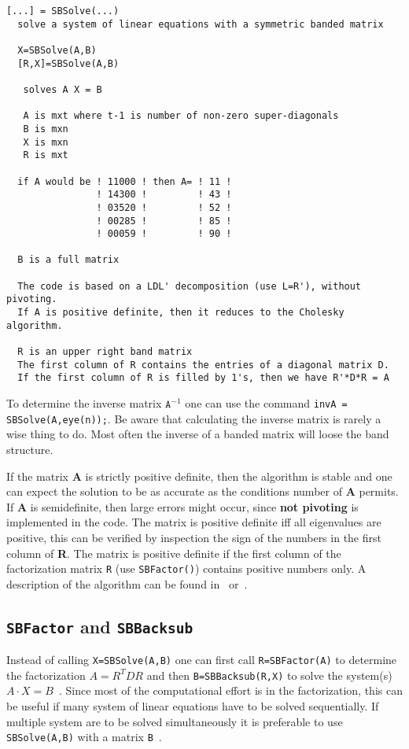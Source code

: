 \documentclass[11pt]{article}
\begin{document}
\begin{verbatim}
[...] = SBSolve(...)
  solve a system of linear equations with a symmetric banded matrix

  X=SBSolve(A,B)
  [R,X]=SBSolve(A,B)

   solves A X = B

   A is mxt where t-1 is number of non-zero super-diagonals
   B is mxn
   X is mxn
   R is mxt

  if A would be ! 11000 ! then A= ! 11 ! 
                ! 14300 !         ! 43 ! 
                ! 03520 !         ! 52 ! 
                ! 00285 !         ! 85 ! 
                ! 00059 !         ! 90 ! 

  B is a full matrix

  The code is based on a LDL' decomposition (use L=R'), without pivoting.
  If A is positive definite, then it reduces to the Cholesky algorithm.

  R is an upper right band matrix
  The first column of R contains the entries of a diagonal matrix D. 
  If the first column of R is filled by 1's, then we have R'*D*R = A
\end{verbatim}

To determine the inverse matrix $\mathtt{A}^{-1}$ one can
use the command \texttt{invA = SBSolve(A,eye(n));}.  Be aware that calculating
the inverse matrix is rarely a wise thing to do. Most often the inverse of a
banded matrix will loose the band structure.

If the matrix \textbf{A} is strictly positive definite, then the algorithm is
stable and one can expect the solution to be as accurate as the conditions
number of \textbf{A} permits. If \textbf{A} is semidefinite, then large errors
might occur, since \textbf{not pivoting} is implemented in the code. The
matrix is positive definite iff all eigenvalues are positive, this can be
verified by inspection the sign of the numbers in the first column of
\textbf{R}.  The matrix is positive definite if the first column of the
factorization matrix \texttt{R} (use \texttt{SBFactor()}) contains positive
numbers only. A description of the algorithm can be found
in~\cite{GoluVanLoan96} or~\cite{VarFem}.

\subsection{\texttt{SBFactor} and \texttt{SBBacksub}}
Instead of calling \texttt{X=SBSolve(A,B)} one can first call
\texttt{R=SBFactor(A)} to determine the factorization $A=R^TDR$ and
then \texttt{B=SBBacksub(R,X)} to solve the system(s) $A\cdot X=B$~.
Since most of the computational effort is in the factorization, this can be
useful if many system of linear equations have to be solved sequentially.
If multiple system are to be solved simultaneously it is preferable to use
\texttt{SBSolve(A,B)} with a matrix \texttt{B}~.
\end{document}
